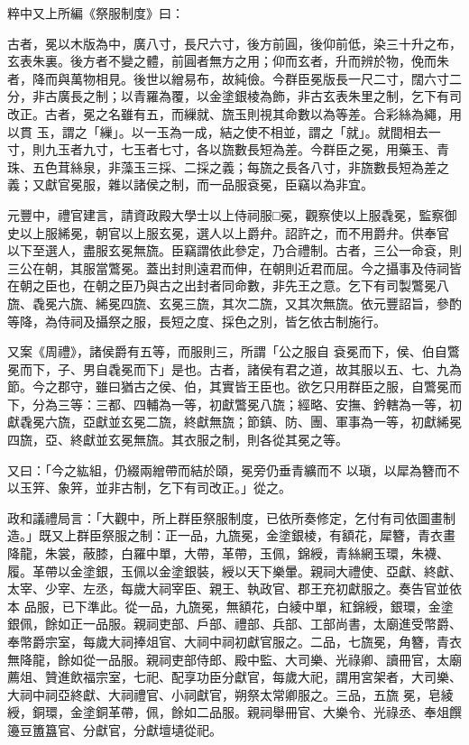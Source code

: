 \begin{pinyinscope}
 粹中又上所編《祭服制度》曰：



 古者，冕以木版為中，廣八寸，長尺六寸，後方前圓，後仰前低，染三十升之布，玄表朱裏。後方者不變之體，前圓者無方之用；仰而玄者，升而辨於物，俛而朱者，降而與萬物相見。後世以繒易布，故純儉。今群臣冕版長一尺二寸，闊六寸二分，非古廣長之制；以青羅為覆，以金塗銀棱為飾，非古玄表朱里之制，乞下有司改正。古者，冕之名雖有五，而繅就、旒玉則視其命數以為等差。合彩絲為繩，用以貫
 玉，謂之「繅」。以一玉為一成，結之使不相並，謂之「就」。就間相去一寸，則九玉者九寸，七玉者七寸，各以旒數長短為差。今群臣之冕，用藥玉、青珠、五色茸絲泉，非藻玉三採、二採之義；每旒之長各八寸，非旒數長短為差之義；又獻官冕服，雜以諸侯之制，而一品服袞冕，臣竊以為非宜。



 元豐中，禮官建言，請資政殿大學士以上侍祠服□冕，觀察使以上服毳冕，監察御史以上服絺冕，朝官以上服玄冕，選人以上爵弁。詔許之，而不用爵弁。供奉官
 以下至選人，盡服玄冕無旒。臣竊謂依此參定，乃合禮制。古者，三公一命袞，則三公在朝，其服當鷩冕。蓋出封則遠君而伸，在朝則近君而屈。今之攝事及侍祠皆在朝之臣也，在朝之臣乃與古之出封者同命數，非先王之意。乞下有司製鷩冕八旒、毳冕六旒、絺冕四旒、玄冕三旒，其次二旒，又其次無旒。依元豐詔旨，參酌等降，為侍祠及攝祭之服，長短之度、採色之別，皆乞依古制施行。



 又案《周禮》，諸侯爵有五等，而服則三，所謂「公之服自
 袞冕而下，侯、伯自鷩冕而下，子、男自毳冕而下」是也。古者，諸侯有君之道，故其服以五、七、九為節。今之郡守，雖曰猶古之侯、伯，其實皆王臣也。欲乞只用群臣之服，自鷩冕而下，分為三等：三都、四輔為一等，初獻鷩冕八旒；經略、安撫、鈐轄為一等，初獻毳冕六旒，亞獻並玄冕二旒，終獻無旒；節鎮、防、團、軍事為一等，初獻絺冕四旒，亞、終獻並玄冕無旒。其衣服之制，則各從其冕之等。



 又曰：「今之紘組，仍綴兩繒帶而結於頤，冕旁仍垂青纊而不
 以瑱，以犀為簪而不以玉笄、象笄，並非古制，乞下有司改正。」從之。



 政和議禮局言：「大觀中，所上群臣祭服制度，已依所奏修定，乞付有司依圖畫制造。」既又上群臣祭服之制：正一品，九旒冕，金塗銀棱，有額花，犀簪，青衣畫降龍，朱裳，蔽膝，白羅中單，大帶，革帶，玉佩，錦綬，青絲網玉環，朱襪、履。革帶以金塗銀，玉佩以金塗銀裝，綬以天下樂暈。親祠大禮使、亞獻、終獻、太宰、少宰、左丞，每歲大祠宰臣、親王、執政官、郡王充初獻服之。奏告官並依本
 品服，已下準此。從一品，九旒冕，無額花，白綾中單，紅錦綬，銀環，金塗銀佩，餘如正一品服。親祠吏部、戶部、禮部、兵部、工部尚書，太廟進受幣爵、奉幣爵宗室，每歲大祠捧俎官、大祠中祠初獻官服之。二品，七旒冕，角簪，青衣無降龍，餘如從一品服。親祠吏部侍郎、殿中監、大司樂、光祿卿、讀冊官，太廟薦俎、贊進飲福宗室，七祀、配享功臣分獻官，每歲大祀，謂用宮架者，大司樂、大祠中祠亞終獻、大祠禮官、小祠獻官，朔祭太常卿服之。三品，五旒
 冕，皂綾綬，銅環，金塗銅革帶，佩，餘如二品服。親祠舉冊官、大樂令、光祿丞、奉俎饌籩豆簠簋官、分獻官，分獻壇壝從祀。




\end{pinyinscope}
